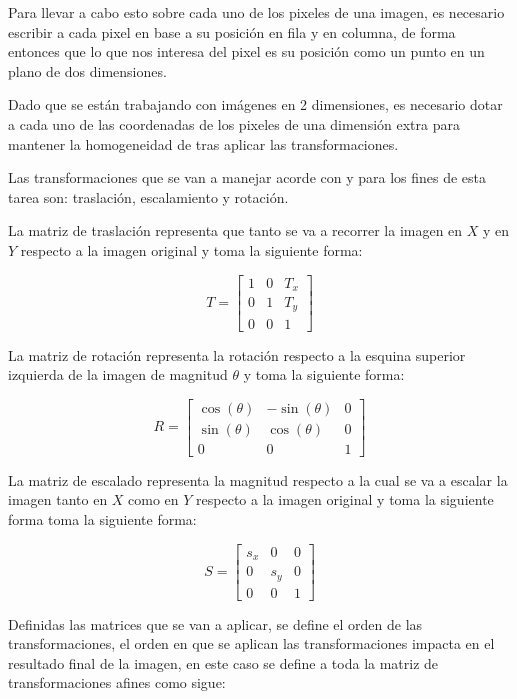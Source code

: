 \documentclass[11pt, letterpaper]{article}
\begin{document}
Para llevar a cabo esto sobre cada uno de los pixeles de una imagen, es necesario escribir a cada pixel en base a su posición en fila y en columna, de forma entonces que lo que nos interesa del pixel es su posición como un punto en un plano de dos dimensiones.

Dado que se están trabajando con imágenes en 2 dimensiones, es necesario dotar a cada uno de las coordenadas de los pixeles de una dimensión extra para mantener la homogeneidad de tras aplicar las transformaciones.

Las transformaciones que se van a manejar acorde con \cite{gonzalez2018digital} y para los fines de esta tarea son: traslación, escalamiento y rotación.

La matriz de traslación representa que tanto se va a recorrer la imagen en $X$ y en $Y$ respecto a la imagen original y toma la siguiente forma:

$$
T = 
\begin{bmatrix}
	1 & 0 & T_x \\
	0 & 1 & T_y \\
	0 & 0 & 1
\end{bmatrix}
$$


La matriz de rotación representa la rotación respecto a la esquina superior izquierda de la imagen de magnitud $\theta$ y toma la siguiente forma:

\[
R = 
\begin{bmatrix}
	\cos(\theta) & -\sin(\theta) & 0 \\
	\sin(\theta) & \cos(\theta)  & 0 \\
	0            & 0             & 1
\end{bmatrix}
\]


La matriz de escalado representa la magnitud respecto a la cual se va a escalar la imagen tanto en $X$ como en $Y$ respecto a la imagen original y toma la siguiente forma toma la siguiente forma:

$$
S = 
\begin{bmatrix}
	s_x & 0   & 0 \\
	0   & s_y & 0 \\
	0   & 0   & 1
\end{bmatrix}
$$

\newpage

Definidas las matrices que se van a aplicar, se define el orden de las transformaciones, el orden en que se aplican las transformaciones impacta en el resultado final de la imagen, en este caso se define a toda la matriz de transformaciones afines como sigue:
\end{document}
